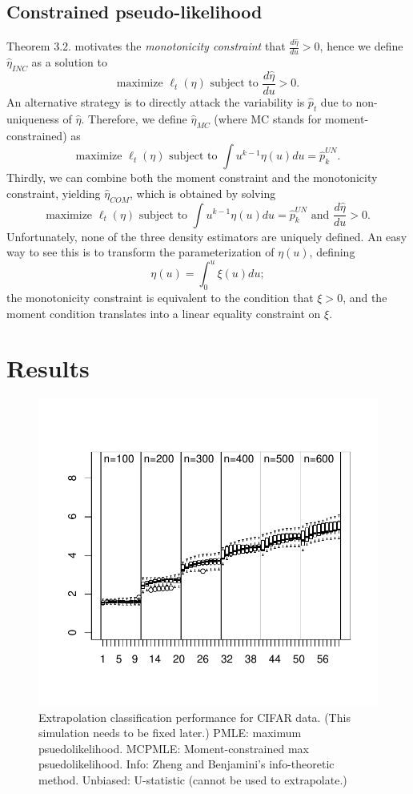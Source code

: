 \documentclass{article}
\begin{document}
\subsection{Constrained pseudo-likelihood}

Theorem 3.2. motivates the \emph{monotonicity constraint} that $\frac{d\hat{\eta}}{du} > 0$,
hence we define $\hat{\eta}_{INC}$ as a solution to
\[
\text{maximize }\ell_t(\eta) \text{ subject to }\frac{d\hat{\eta}}{du} > 0.
\]
An alternative strategy is to directly attack the variability is $\hat{p}_t$ due to non-uniqueness of $\hat{\eta}$.
Therefore, we define $\hat{\eta}_{MC}$ (where MC stands for moment-constrained)
as
\[
\text{maximize }\ell_t(\eta) \text{ subject to }\int u^{k-1} \eta(u) du = \hat{p}_k^{UN}.
\]
Thirdly, we can combine both the moment constraint and the monotonicity constraint, yielding
$\hat{\eta}_{COM}$, which is obtained by solving
\[
\text{maximize }\ell_t(\eta) \text{ subject to }\int u^{k-1} \eta(u) du = \hat{p}_k^{UN}\text{ and }\frac{d\hat{\eta}}{du} > 0.
\]
Unfortunately, none of the three density estimators are uniquely defined.
An easy way to see this is to transform the parameterization of $\eta(u)$,
defining
\[
\eta(u) = \int_0^u \xi(u) du;
\]
the monotonicity constraint is equivalent to the condition that $\xi > 0$,
and the moment condition translates into a linear equality constraint on $\xi$.



\section{Results}

\begin{figure}
\centering
\includegraphics[scale = 0.6]{gabor_random_Y.pdf}
\caption{Extrapolation classification performance for CIFAR data.  (This simulation needs to be fixed later.)
PMLE: maximum psuedolikelihood. MCPMLE: Moment-constrained max psuedolikelihood.  Info: Zheng and Benjamini's info-theoretic method.
Unbiased: U-statistic (cannot be used to extrapolate.) }
\end{figure}
\end{document}
